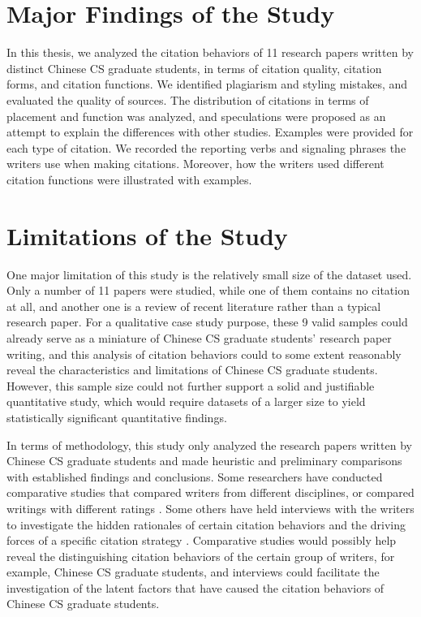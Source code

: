 \section{Major Findings of the Study}
In this thesis, we analyzed the citation behaviors of 11 research papers written by distinct Chinese CS graduate students, in terms of citation quality, citation forms, and citation functions. We identified plagiarism and styling mistakes, and evaluated the quality of sources. The distribution of citations in terms of placement and function was analyzed, and speculations were proposed as an attempt to explain the differences with other studies. Examples were provided for each type of citation. We recorded the reporting verbs and signaling phrases the writers use when making citations. Moreover, how the writers used different citation functions were illustrated with examples.

\section{Limitations of the Study}

One major limitation of this study is the relatively small size of the dataset used. Only a number of 11 papers were studied, while one of them contains no citation at all, and another one is a review of recent literature rather than a typical research paper. For a qualitative case study purpose, these 9 valid samples could already serve as a miniature of Chinese CS graduate students’ research paper writing, and this analysis of citation behaviors could to some extent reasonably reveal the characteristics and limitations of Chinese CS graduate students. However, this sample size could not further support a solid and justifiable quantitative study, which would require datasets of a larger size to yield statistically significant quantitative findings.

In terms of methodology, this study only analyzed the research papers written by Chinese CS graduate students and made heuristic and preliminary comparisons with established findings and conclusions. Some researchers have conducted comparative studies that compared writers from different disciplines, or compared writings with different ratings \citep{hu_disciplinary_2014,hyland_authority_2002,mansourizadeh_citation_2011,petric_rhetorical_2007,samraj_form_2013}. Some others have held interviews with the writers to investigate the hidden rationales of certain citation behaviors and the driving forces of a specific citation strategy \citep{fazel_citation_2015,harwood_interview-based_2009,wette_source_2017}. Comparative studies would possibly help reveal the distinguishing citation behaviors of the certain group of writers, for example, Chinese CS graduate students, and interviews could facilitate the investigation of the latent factors that have caused the citation behaviors of Chinese CS graduate students.

